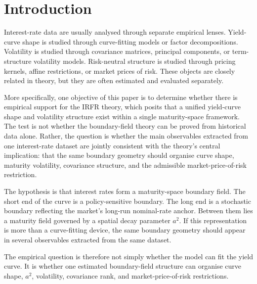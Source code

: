 \documentclass[11pt]{article}
\begin{document}
\begin{abstract}
Taken together, the evidence suggests that the same boundary-field geometry which organises yield-curve shape also organises volatility and risk-neutral drift restrictions. The results do not imply that interest-rate risk premia are globally stationary or that realised mean drift is easy to estimate. They support a more specific claim: interest-rate observables contain a common boundary-field structure linking shape, volatility, covariance, and risk-neutral character.
\end{abstract}

\section{Introduction}

Interest-rate data are usually analysed through separate empirical lenses. Yield-curve shape is studied through curve-fitting models or factor decompositions. Volatility is studied through covariance matrices, principal components, or term-structure volatility models. Risk-neutral structure is studied through pricing kernels, affine restrictions, or market prices of risk. These objects are closely related in theory, but they are often estimated and evaluated separately.

More specifically, one objective of this paper is to determine whether there is empirical support for the IRFR theory, which posits that a unified yield-curve shape and volatility structure exist within a single maturity-space framework. The test is not whether the boundary-field theory can be proved from historical data alone. Rather, the question is whether the main observables extracted from one interest-rate dataset are jointly consistent with the theory's central implication: that the same boundary geometry should organise curve shape, maturity volatility, covariance structure, and the admissible market-price-of-risk restriction.

The hypothesis is that interest rates form a maturity-space boundary field. The short end of the curve is a policy-sensitive boundary. The long end is a stochastic boundary reflecting the market's long-run nominal-rate anchor. Between them lies a maturity field governed by a spatial decay parameter $a^2$. If this representation is more than a curve-fitting device, the same boundary geometry should appear in several observables extracted from the same dataset.

The empirical question is therefore not simply whether the model can fit the yield curve. It is whether one estimated boundary-field structure can organise curve shape, $a^2$, volatility, covariance rank, and market-price-of-risk restrictions.
\end{document}
